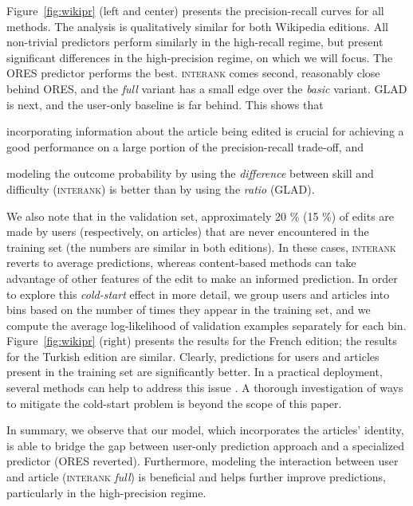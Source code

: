 Figure~\ref{fig:wikipr} (left and center) presents the precision-recall curves for all methods.
The analysis is qualitatively similar for both Wikipedia editions.
All non-trivial predictors perform similarly in the high-recall regime, but present significant differences in the high-precision regime, on which we will focus.
The ORES predictor performs the best.
\textsc{interank} comes second, reasonably close behind ORES, and the \emph{full} variant has a small edge over the \emph{basic} variant.
GLAD is next, and the user-only baseline is far behind.
This shows that
\begin{enuminline}
	\item incorporating information about the article being edited is crucial for achieving a good performance on a large portion of the precision-recall trade-off, and
	\item modeling the outcome probability by using the \emph{difference} between skill and difficulty (\textsc{interank}) is better than by using the \emph{ratio} (GLAD).
\end{enuminline}


We also note that in the validation set, approximately \num{20} \% (\num{15} \%) of edits are made by users (respectively, on articles) that are never encountered in the training set (the numbers are similar in both editions).
In these cases, \textsc{interank} reverts to average predictions, whereas content-based methods can take advantage of other features of the edit to make an informed prediction.
In order to explore this \emph{cold-start} effect in more detail, we group users and articles into bins based on the number of times they appear in the training set, and we compute the average log-likelihood of validation examples separately for each bin.
Figure~\ref{fig:wikipr} (right) presents the results for the French edition;
the results for the Turkish edition are similar.
Clearly, predictions for users and articles present in the training set are significantly better.
In a practical deployment, several methods can help to address this issue \citep{schein2002methods, lam2008addressing, levi2012finding}.
A thorough investigation of ways to mitigate the cold-start problem is beyond the scope of this paper.

In summary, we observe that our model, which incorporates the articles' identity, is able to bridge the gap between user-only prediction approach and a specialized predictor (ORES reverted).
Furthermore, modeling the interaction between user and article (\textsc{interank} \emph{full}) is beneficial and helps further improve predictions, particularly in the high-precision regime.


